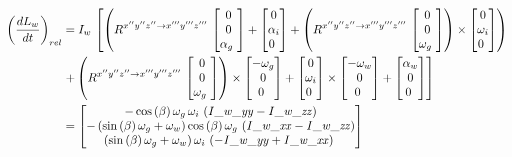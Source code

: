 \begin{align*}
\left(\frac{dL_{w}}{dt}\right)_{rel}&=I_{w}\,\left[\left(R^{x''y''z'' \rightarrow x'''y'''z'''}\,\begin{bmatrix}
0\\
0\\
\alpha_{g}\
\end{bmatrix}
+\begin{bmatrix}
0\\
\alpha_{i}\\
0\
\end{bmatrix}
+\left(R^{x''y''z'' \rightarrow x'''y'''z'''}\,\begin{bmatrix}
0\\
0\\
\omega_{g}\
\end{bmatrix}
\right)\times\begin{bmatrix}
0\\
\omega_{i}\\
0\
\end{bmatrix}
\right)\right.\\
&\left.+\left(R^{x''y''z'' \rightarrow x'''y'''z'''}\,\begin{bmatrix}
0\\
0\\
\omega_{g}\
\end{bmatrix}\right)\times\begin{bmatrix}
-\omega_{g}\\
0\\
0\
\end{bmatrix}+\begin{bmatrix}
0\\
\omega_{i}\\
0\
\end{bmatrix}\times\begin{bmatrix}
-\omega_{w}\\
0\\
0\
\end{bmatrix}+\begin{bmatrix}
\alpha_{w}\\
0\\
0\
\end{bmatrix}
\right]\\
&=\begin{bmatrix}
-\cos \left( \beta \right) \omega_{g}\,
\omega_{i}\, \left( {\it I\_w\_yy}-{\it I\_w\_zz} \right) 
\\ 
%
- \left( \sin \left( \beta \right) \omega_{g}+
\omega_{w} \right) \cos \left( \beta \right) \omega_{g}\, \left( {\it 
I\_w\_xx}-{\it I\_w\_zz} \right) \\ 
%
 \left( \sin
 \left( \beta \right) \omega_{g}+\omega_{w} \right) \omega_{i}\,
 \left( -{\it I\_w\_yy}+{\it I\_w\_xx} \right) \
\end{bmatrix}
\end{align*}

